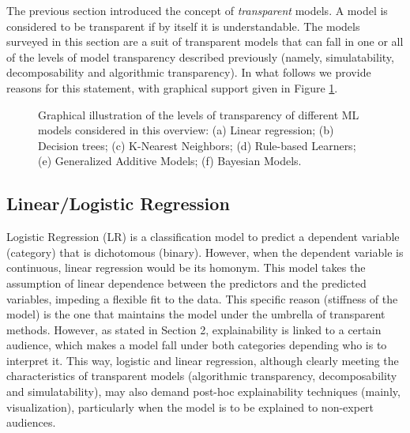 \documentclass[final]{elsarticle}
\begin{document}
The previous section introduced the concept of \textit{transparent} models. A model is considered to be transparent if by itself it is understandable. The models surveyed in this section are a suit of transparent models that can fall in one or all of the levels of model transparency described previously (namely, simulatability, decomposability and algorithmic transparency). In what follows we provide reasons for this statement, with graphical support given in Figure \ref{fig:transparentShow}.
\begin{figure}[h]
        \caption{Graphical illustration of the levels of transparency of different ML models considered in this overview: (a) Linear regression; (b) Decision trees; (c) K-Nearest Neighbors; (d) Rule-based Learners; (e) Generalized Additive Models; (f) Bayesian Models.}
        \label{fig:transparentShow}
      \end{figure}

\subsection{Linear/Logistic Regression}

Logistic Regression (LR) is a classification model to predict a dependent variable (category) that is dichotomous (binary). However, when the dependent variable is continuous, linear regression would be its homonym. This model takes the assumption of linear dependence between the predictors and the predicted variables, impeding a flexible fit to the data. This specific reason (stiffness of the model) is the one that maintains the model under the umbrella of transparent methods. However, as stated in Section 2, explainability is linked to a certain audience, which makes a model fall under both categories depending who is to interpret it. This way, logistic and linear regression, although clearly meeting the characteristics of transparent models (algorithmic transparency, decomposability and simulatability), may also demand post-hoc explainability techniques (mainly, visualization), particularly when the model is to be explained to non-expert audiences.
\end{document}
